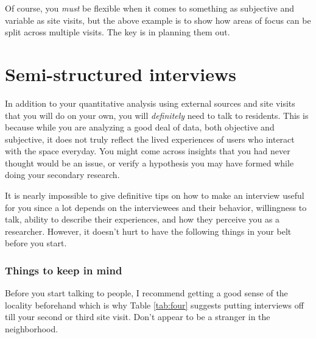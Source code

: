 \documentclass[
]{latex/krantz}
\begin{document}
Of course, you \emph{must} be flexible when it comes to something as subjective and variable as site visits, but the above example is to show how areas of focus can be split across multiple visits. The key is in planning them out.

\hypertarget{interviews}{%
\section{Semi-structured interviews}\label{interviews}}

In addition to your quantitative analysis using external sources and site visits that you will do on your own, you will \emph{definitely} need to talk to residents. This is because while you are analyzing a good deal of data, both objective and subjective, it does not truly reflect the lived experiences of users who interact with the space everyday. You might come across insights that you had never thought would be an issue, or verify a hypothesis you may have formed while doing your secondary research.

It is nearly impossible to give definitive tips on how to make an interview useful for you since a lot depends on the interviewees and their behavior, willingness to talk, ability to describe their experiences, and how they perceive you as a researcher. However, it doesn't hurt to have the following things in your belt before you start.

\hypertarget{kim}{%
\subsubsection{Things to keep in mind}\label{kim}}

Before you start talking to people, I recommend getting a good sense of the locality beforehand which is why Table \ref{tab:four} suggests putting interviews off till your second or third site visit. Don't appear to be a stranger in the neighborhood.
\end{document}

